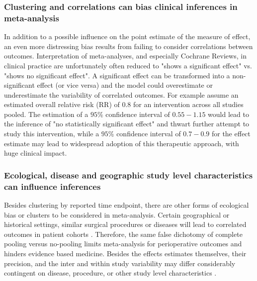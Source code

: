 \documentclass[11pt,notitlepage]{article}
\begin{document}
\subsubsection*{Clustering and correlations can bias clinical inferences in meta-analysis }
In addition to a possible influence on the point estimate of the measure of effect, 
an even more distressing bias results from failing to consider correlations 
between outcomes. Interpretation of meta-analyses, and especially Cochrane Reviews, in clinical practice 
are unfortunately often reduced to "shows a significant effect" vs. "shows 
no significant effect". A significant effect can be transformed into a non-significant 
effect (or vice versa) and the model could overestimate or underestimate the variability of correlated outcomes. 
For example assume an estimated overall relative risk (RR) of $0.8$ for an 
intervention across all studies pooled. The estimation of a $95$\% confidence 
interval of $0.55-1.15$ would lead to the inference of "no statistically 
significant effect" and thwart further attempt to study this intervention, 
while a $95$\% confidence interval of $0.7-0.9$ for the effect estimate may 
lead to widespread adoption of this therapeutic approach, with huge clinical impact.

\subsubsection*{Ecological, disease and geographic study level characteristics can influence inferences}
Besides clustering by reported time endpoint, there are other forms of ecological bias or clusters to be considered in 
meta-analysis. Certain geographical or historical settings, similar surgical procedures or diseases will lead to correlated 
outcomes in patient cohorts \cite{Abroug2011,Andreae2013,Andreae2015,Roth2015CriticalCare}. 
Therefore, the same false dichotomy of 
complete pooling versus no-pooling limits meta-analysis for perioperative outcomes and hinders evidence based medicine. 
Besides the effects estimates themselves, their precision, and the inter and within study variability may differ considerably 
contingent on disease, procedure, or other study level characteristics \cite{Andreae2013,Andreae2015,Roth2015CriticalCare}.
\end{document}
